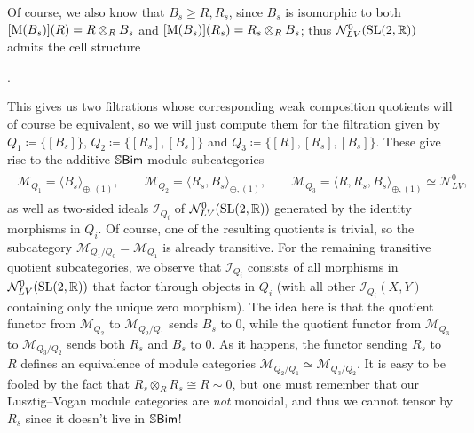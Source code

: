 \begin{example}
\noindent Of course, we also know that $B_{s} \geq R, R_{s}$, since $B_{s}$ is isomorphic to both $[\textup{M}(B_{s})](R) = R \otimes_R B_{s}$ and $[\textup{M}(B_{s})](R_{s}) = R_{s} \otimes_R B_{s}$; thus $\mathcal{N}_{LV}^0(\textup{SL}(2, \mathbb{R}))$ admits the cell structure %
\begin{center}
.
\end{center}
\noindent This gives us two filtrations whose corresponding weak composition quotients will of course be equivalent, so we will just compute them for the filtration given by ${Q_1 \coloneqq \{[B_{s}]\}}$, ${Q_2 \coloneqq \{[R_{s}], [B_{s}]\}}$ and ${Q_3 \coloneqq \{[R], [R_{s}], [B_{s}]\}}$. These give rise to the additive $\mathbb{S}\textup{\textsf{Bim}}$-module subcategories
\begin{align*}
\begin{split}
\mathcal{M}_{Q_1} = \langle B_{s} \rangle_{\oplus,(1)},\qquad\mathcal{M}_{Q_2} = \langle R_{s}, B_{s}\rangle_{\oplus,(1)},\qquad\mathcal{M}_{Q_3} = \langle R, R_{s}, B_{s}\rangle_{\oplus,(1)} \simeq \mathcal{N}_{LV}^0,
\end{split}
\end{align*}
\noindent as well as two-sided ideals $\mathcal{I}_{Q_i}$ of $\mathcal{N}_{LV}^0(\textup{SL}(2, \mathbb{R}))$ generated by the identity morphisms in $Q_i$. Of course, one of the resulting quotients is trivial, so the subcategory $\mathcal{M}_{Q_1/Q_0} = \mathcal{M}_{Q_1}$ is already transitive. For the remaining transitive quotient subcategories, we observe that $\mathcal{I}_{Q_i}$ consists of all morphisms in $\mathcal{N}_{LV}^0(\textup{SL}(2, \mathbb{R}))$ that factor through objects in $Q_i$ (with all other $\mathcal{I}_{Q_i}(X, Y)$ containing %
only the unique zero morphism). The idea here is that the quotient functor from $\mathcal{M}_{Q_2}$ to $\mathcal{M}_{Q_2/Q_1}$ sends $B_s$ to $0$, while the quotient functor from $\mathcal{M}_{Q_3}$ to $\mathcal{M}_{Q_3/Q_2}$ sends both $R_s$ and $B_s$ to $0$. As it happens, the functor sending $R_s$ to $R$ defines an equivalence of module categories $\mathcal{M}_{Q_2/Q_1} \simeq \mathcal{M}_{Q_3/Q_2}$. It is easy to be fooled by the fact that $R_s \otimes_R R_s \cong R \sim 0$, but one must remember that our Lusztig--Vogan module categories are {\em not} monoidal, and thus we cannot tensor by $R_s$ since it doesn't live in $\mathbb{S}\textup{\textsf{Bim}}$!\\ %

\end{example}
